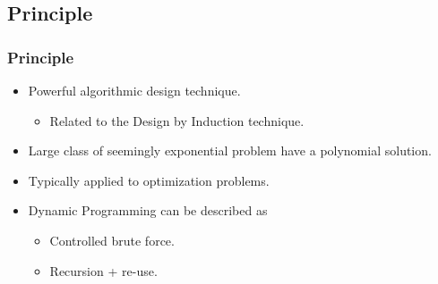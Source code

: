 \documentclass{beamer}
\begin{document}
\subsection{Principle}
\begin{frame}%
\frametitle{Principle}

\begin{itemize}

\item Powerful algorithmic design technique.
\begin{itemize}
\item Related to the Design by Induction technique.
\end{itemize}

\vspace{0.3cm}

\item<2-> Large class of seemingly exponential problem have a polynomial solution.

\vspace{0.3cm}

\item<3-> Typically applied to optimization problems.

\vspace{0.3cm}

\item<4-> Dynamic Programming can be described as
\begin{itemize}
\item Controlled brute force.
\item Recursion + re-use.
\end{itemize}

\end{itemize}

\end{frame}
\end{document}

